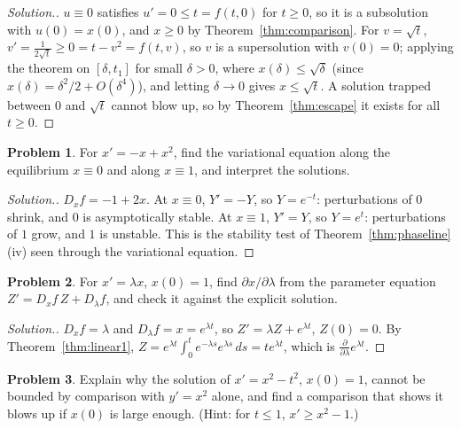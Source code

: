 \documentclass[11pt,a4paper]{article}
\numberwithin{equation}{section}
\theoremstyle{definition}
\newtheorem{problemx}{Problem}[subsection]
\newenvironment{problem}{\begin{problemx}}{\end{problemx}}
\newenvironment{solution}
  {\renewcommand{\qedsymbol}{}\begin{proof}[\textit{Solution}.]}
  {\end{proof}}
\begin{document}
\begin{solution}
$u \equiv 0$ satisfies $u' = 0 \leq t = f(t, 0)$ for $t \geq 0$, so it is a subsolution with $u(0) = x(0)$, and $x \geq 0$ by Theorem~\ref{thm:comparison}. For $v = \sqrt t$, $v' = \frac{1}{2\sqrt t} \geq 0 = t - v^2 = f(t, v)$,
so $v$ is a supersolution with $v(0) = 0$; applying the theorem on $[\delta, t_1]$ for small $\delta > 0$, where $x(\delta) \leq \sqrt\delta$ (since $x(\delta) = \delta^2/2 + O(\delta^4)$), and letting $\delta \to 0$ gives $x \leq \sqrt t$. A
solution trapped between $0$ and $\sqrt t$ cannot blow up, so by Theorem~\ref{thm:escape} it exists for all $t \geq 0$.
\end{solution}

\begin{problem}
For $x' = -x + x^2$, find the variational equation along the equilibrium $x \equiv 0$ and along $x \equiv 1$, and interpret the solutions.
\end{problem}

\begin{solution}
$D_xf = -1 + 2x$. At $x \equiv 0$, $Y' = -Y$, so $Y = e^{-t}$: perturbations of $0$ shrink, and $0$ is asymptotically stable. At $x \equiv 1$, $Y' = Y$, so $Y = e^t$: perturbations of $1$ grow, and $1$ is unstable.
This is the stability test of Theorem~\ref{thm:phaseline}(iv) seen through the variational equation.
\end{solution}

\begin{problem}
For $x' = \lambda x$, $x(0) = 1$, find $\partial x/\partial\lambda$ from the parameter equation $Z' = D_xf\,Z + D_\lambda f$, and check it against the explicit solution.
\end{problem}

\begin{solution}
$D_xf = \lambda$ and $D_\lambda f = x = e^{\lambda t}$, so $Z' = \lambda Z + e^{\lambda t}$, $Z(0) = 0$. By Theorem~\ref{thm:linear1}, $Z = e^{\lambda t}\int_0^te^{-\lambda s}e^{\lambda s}\,ds = te^{\lambda t}$, which is $\frac{\partial}{\partial\lambda}e^{\lambda t}$.
\end{solution}

\begin{problem}
Explain why the solution of $x' = x^2 - t^2$, $x(0) = 1$, cannot be bounded by comparison with $y' = x^2$ alone, and find a comparison that shows it blows up if $x(0)$ is large
enough. (Hint: for $t \leq 1$, $x' \geq x^2 - 1$.)
\end{problem}
\end{document}
